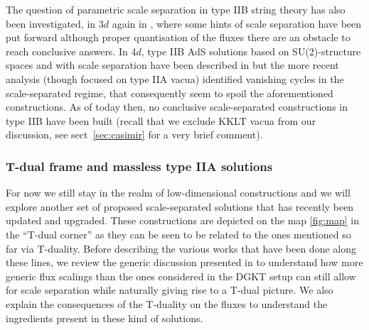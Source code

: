 \documentclass[11pt, a4paper]{article}
\begin{document}
The question of parametric scale separation in type IIB string theory has also been investigated, in 3$d$ again in \cite{Emelin:2021gzx}, where some hints of scale separation have been put forward although proper quantisation of the fluxes there are an obstacle to reach conclusive answers. In 4$d$, type IIB AdS solutions based on SU(2)-structure spaces and with scale separation have been described in \cite{Caviezel:2009tu,Petrini:2013ika} but the more recent analysis \cite{Cribiori:2021djm} (though focused on type IIA vacua) identified vanishing cycles in the scale-separated regime, that consequently seem to spoil the aforementioned constructions. As of today then, no conclusive scale-separated constructions in type IIB have been built (recall that we exclude KKLT vacua from our discussion, see sect~\ref{sec:casimir} for a very brief comment).

\subsubsection{T-dual frame and massless type IIA solutions}
\label{sec:Tdual}

For now we still stay in the realm of low-dimensional constructions and we will explore another set of proposed scale-separated solutions that has recently been updated and upgraded. These constructions are depicted on the map \ref{fig:map} in the ``T-dual corner'' as they can be seen to be related to the ones mentioned so far via T-duality. Before describing the various works that have been done along these lines, we review the generic discussion presented in \cite{Carrasco:2023hta} to understand how more generic flux scalings than the ones considered in the DGKT setup can still allow for scale separation while naturally giving rise to a T-dual picture. We also explain the consequences of the T-duality on the fluxes to understand the ingredients present in these kind of solutions.
\end{document}
